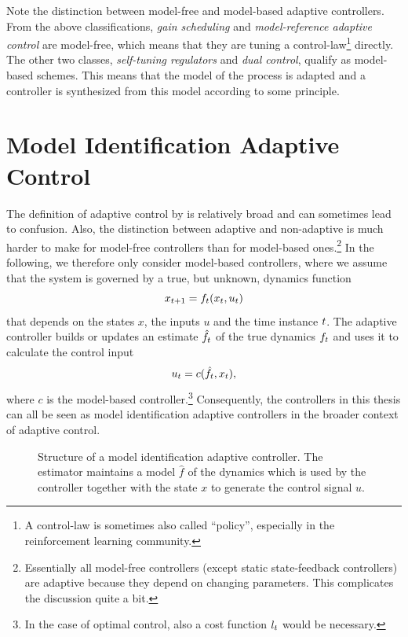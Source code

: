 Note the distinction between model-free and model-based adaptive controllers.
From the above classifications, \emph{gain scheduling} and
\emph{model-reference adaptive control} are model-free, which means that they
are tuning a control-law\footnote{A control-law is sometimes also called
``policy'', especially in the reinforcement learning community.} directly. The
other two classes, \emph{self-tuning regulators} and \emph{dual control},
qualify as model-based schemes. This means that the model of the process is
adapted and a controller is synthesized from this model according to some
principle.

\section{Model Identification Adaptive Control}

The definition of adaptive control by \textcite{Astrom.Wittenmark:1994:Adaptive}
is relatively broad and can sometimes lead to confusion. Also, the distinction
between adaptive and non-adaptive is much harder to make for model-free
controllers than for model-based ones.\footnote{Essentially all model-free
controllers (except static state-feedback controllers) are adaptive because
they depend on changing parameters. This complicates the discussion quite a
bit.}
In the following, we therefore only consider model-based controllers, where we
assume that the system is governed by a true, but unknown, dynamics function
\begin{equation}
  x_{t+1} = f_t(x_t,u_t)
\end{equation}
that depends on the states $x$, the inputs $u$ and the time instance $t$. The
adaptive controller builds or updates an estimate $\hat f_t$ of the true
dynamics $f_t$ and uses it to calculate the control input
\begin{equation}
  u_t = c(\hat f_t, x_t),
\end{equation}
where $c$ is the model-based controller.\footnote{In the case of optimal
control, also a cost function $l_t$ would be necessary.}
Consequently, the controllers in this thesis can all be seen as model
identification adaptive controllers in the broader context of adaptive control.

\begin{figure}
  \center%
  \caption[Structure of a model identification adaptive controller.]{
  Structure of a model identification adaptive controller.
  The estimator maintains a model $\hat f$ of the dynamics which is used by the
  controller together with the state $x$ to generate the control signal $u$.}
\end{figure}

